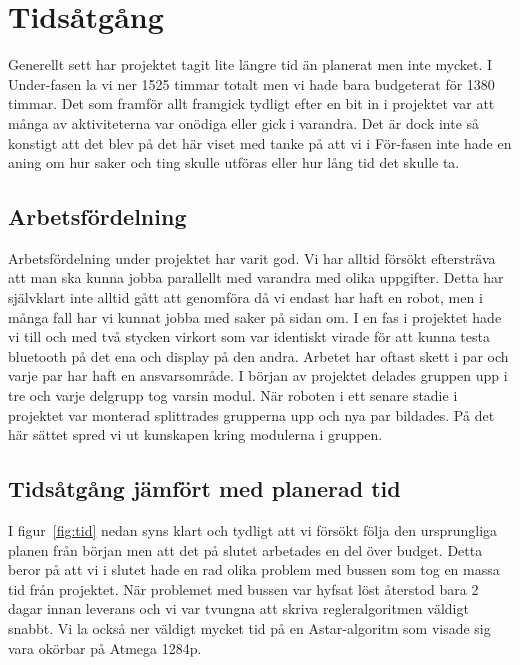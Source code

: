 \documentclass[a4paper,12pt,fleqn]{article}
\begin{document}
\addto\captionsswedish{\renewcommand{\contentsname}{Innehållsförteckning}}

\tableofcontents
\newpage
\thispagestyle{fancy}


\section{Tidsåtgång}
Generellt sett har projektet tagit lite längre tid än planerat men inte mycket. I Under-fasen la vi ner 1525 timmar totalt men vi hade bara budgeterat för 1380 timmar. Det som framför allt framgick tydligt efter en bit in i projektet var att många av aktiviteterna var onödiga eller gick i varandra. Det är dock inte så konstigt att det blev på det här viset med tanke på att vi i För-fasen inte hade en aning om hur saker och ting skulle utföras eller hur lång tid det skulle ta. 
\subsection{Arbetsfördelning}
Arbetsfördelning under projektet har varit god. Vi har alltid försökt eftersträva att man ska kunna jobba parallellt med varandra med olika uppgifter. Detta har självklart inte alltid gått att genomföra då vi endast har haft en robot, men i många fall har vi kunnat jobba med saker på sidan om. I en fas i projektet hade vi till och med två stycken virkort som var identiskt virade för att kunna testa bluetooth på det ena och display på den andra. Arbetet har oftast skett i par och varje par har haft en ansvarsområde. I början av projektet delades gruppen upp i tre och varje delgrupp tog varsin modul. När roboten i ett senare stadie i projektet var monterad splittrades grupperna upp och nya par bildades. På det här sättet spred vi ut kunskapen kring modulerna i gruppen. 

\subsection{Tidsåtgång jämfört med planerad tid}
I figur~\ref{fig:tid} nedan syns klart och tydligt att vi försökt följa den ursprungliga planen från början men att det på slutet arbetades en del över budget. Detta beror på att vi i slutet hade en rad olika problem med bussen som tog en massa tid från projektet. När problemet med bussen var hyfsat löst återstod bara 2 dagar innan leverans och vi var tvungna att skriva regleralgoritmen väldigt snabbt. Vi la också ner väldigt mycket tid på en Astar-algoritm som visade sig vara okörbar på Atmega 1284p. 
\end{document}
